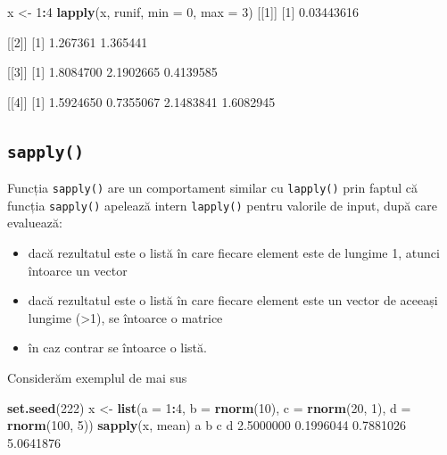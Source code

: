 \documentclass[]{article}
\newenvironment{Shaded}{\begin{snugshade}}{\end{snugshade}}
\newcommand{\DataTypeTok}[1]{\textcolor[rgb]{0.13,0.29,0.53}{#1}}
\newcommand{\DecValTok}[1]{\textcolor[rgb]{0.00,0.00,0.81}{#1}}
\newcommand{\FloatTok}[1]{\textcolor[rgb]{0.00,0.00,0.81}{#1}}
\newcommand{\KeywordTok}[1]{\textcolor[rgb]{0.13,0.29,0.53}{\textbf{#1}}}
\newcommand{\NormalTok}[1]{#1}
\newcommand{\OperatorTok}[1]{\textcolor[rgb]{0.81,0.36,0.00}{\textbf{#1}}}
\newcommand{\StringTok}[1]{\textcolor[rgb]{0.31,0.60,0.02}{#1}}
\newcounter{exo}[section]
\begin{document}
\begin{Shaded}
\begin{Highlighting}[]
\NormalTok{x <-}\StringTok{ }\DecValTok{1}\OperatorTok{:}\DecValTok{4}
\KeywordTok{lapply}\NormalTok{(x, runif, }\DataTypeTok{min =} \DecValTok{0}\NormalTok{, }\DataTypeTok{max =} \DecValTok{3}\NormalTok{)}
\NormalTok{[[}\DecValTok{1}\NormalTok{]]}
\NormalTok{[}\DecValTok{1}\NormalTok{] }\FloatTok{0.03443616}

\NormalTok{[[}\DecValTok{2}\NormalTok{]]}
\NormalTok{[}\DecValTok{1}\NormalTok{] }\FloatTok{1.267361} \FloatTok{1.365441}

\NormalTok{[[}\DecValTok{3}\NormalTok{]]}
\NormalTok{[}\DecValTok{1}\NormalTok{] }\FloatTok{1.8084700} \FloatTok{2.1902665} \FloatTok{0.4139585}

\NormalTok{[[}\DecValTok{4}\NormalTok{]]}
\NormalTok{[}\DecValTok{1}\NormalTok{] }\FloatTok{1.5924650} \FloatTok{0.7355067} \FloatTok{2.1483841} \FloatTok{1.6082945}
\end{Highlighting}
\end{Shaded}

\hypertarget{sapply}{%
\subsection{\texorpdfstring{\texttt{sapply()}}{sapply()}}\label{sapply}}

Funcția \texttt{sapply()} are un comportament similar cu
\texttt{lapply()} prin faptul că funcția \texttt{sapply()} apelează
intern \texttt{lapply()} pentru valorile de input, după care evaluează:

\begin{itemize}
\item
  dacă rezultatul este o listă în care fiecare element este de lungime
  1, atunci întoarce un vector
\item
  dacă rezultatul este o listă în care fiecare element este un vector de
  aceeași lungime (\textgreater1), se întoarce o matrice
\item
  în caz contrar se întoarce o listă.
\end{itemize}

Considerăm exemplul de mai sus

\begin{Shaded}
\begin{Highlighting}[]
\KeywordTok{set.seed}\NormalTok{(}\DecValTok{222}\NormalTok{)}
\NormalTok{x <-}\StringTok{ }\KeywordTok{list}\NormalTok{(}\DataTypeTok{a =} \DecValTok{1}\OperatorTok{:}\DecValTok{4}\NormalTok{, }\DataTypeTok{b =} \KeywordTok{rnorm}\NormalTok{(}\DecValTok{10}\NormalTok{), }\DataTypeTok{c =} \KeywordTok{rnorm}\NormalTok{(}\DecValTok{20}\NormalTok{, }\DecValTok{1}\NormalTok{), }\DataTypeTok{d =} \KeywordTok{rnorm}\NormalTok{(}\DecValTok{100}\NormalTok{, }\DecValTok{5}\NormalTok{))}
\KeywordTok{sapply}\NormalTok{(x, mean)}
\NormalTok{        a         b         c         d }
\FloatTok{2.5000000} \FloatTok{0.1996044} \FloatTok{0.7881026} \FloatTok{5.0641876} 
\end{Highlighting}
\end{Shaded}
\end{document}
